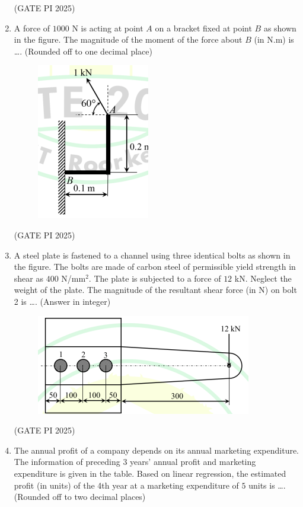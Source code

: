 \documentclass[journal,12pt,onecolumn]{IEEEtran}
\theoremstyle{remark}
\begin{document}
\begin{enumerate}
\hfill (GATE PI 2025)

\item A force of $1000$ N is acting at point $A$ on a bracket fixed at point $B$ as shown in the figure. The magnitude of the moment of the force about $B$ (in N.m) is \dots. (Rounded off to one decimal place)

\begin{figure}[H]
\centering
\includegraphics[width=0.3\columnwidth]{fig7.png}
\caption{}
\end{figure}


\hfill (GATE PI 2025)


\item A steel plate is fastened to a channel using three identical bolts as shown in the figure. The bolts are made of carbon steel of permissible yield strength in shear as $400$ N/mm$^{2}$. The plate is subjected to a force of $12$ kN. Neglect the weight of the plate. The magnitude of the resultant shear force (in N) on bolt 2 is \dots. (Answer in integer)

\begin{figure}[H]
\centering
\includegraphics[width=0.5\columnwidth]{fig8.png}
\caption{}
\end{figure}


\hfill (GATE PI 2025)

\item The annual profit of a company depends on its annual marketing expenditure. The information of preceding 3 years' annual profit and marketing expenditure is given in the table. Based on linear regression, the estimated profit (in units) of the 4th year at a marketing expenditure of $5$ units is \dots. (Rounded off to two decimal places)



\end{enumerate}
\end{document}
